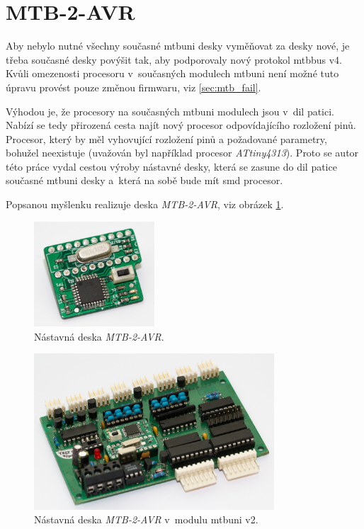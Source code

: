 \newpage
\section{MTB-2-AVR} \label{sec:mtb-2-avr}

Aby nebylo nutné všechny současné \gls{mtbuni} desky vyměňovat za desky nové,
je třeba současné desky povýšit tak, aby podporovaly nový protokol \gls{mtbbus} v4.
Kvůli omezenosti procesoru v~současných modulech \gls{mtbuni} není možné tuto
úpravu provést pouze změnou firmwaru, viz \ref{sec:mtb_fail}.

Výhodou je, že procesory na současných \gls{mtbuni} modulech jsou
v~\gls{dil} patici. Nabízí se tedy přirozená cesta najít nový procesor
odpovídajícího rozložení pinů. Procesor, který by měl vyhovující rozložení pinů
a požadované parametry, bohužel neexistuje (uvažován byl například procesor
\textit{ATtiny4313}). Proto se autor této práce vydal cestou výroby nástavné
desky, která se zasune do \gls{dil} patice současné \gls{mtbuni} desky
a~která na sobě bude mít \gls{smd} procesor.

Popsanou myšlenku realizuje deska \textit{MTB-2-AVR}, viz obrázek
\ref{fig:mtb-2-avr-alone}.

\begin{figure}[ht]
\includegraphics[width=0.4\textwidth]{data/uni-2-upgrade-alone.jpg}
\caption{Nástavná deska \textit{MTB-2-AVR}.}
\label{fig:mtb-2-avr-alone}
\end{figure}

\begin{figure}[ht]
\includegraphics[width=0.8\textwidth]{data/uni-2-upgrade-all.jpg}
\caption{Nástavná deska \textit{MTB-2-AVR} v~modulu \gls{mtbuni} v2.}
\label{fig:mtb-2-avr-inside}
\end{figure}

